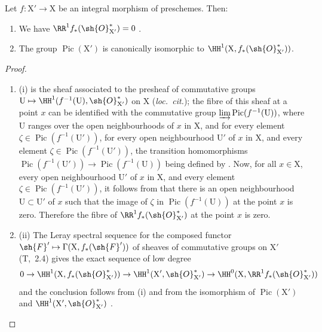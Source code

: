 \begin{corollary}[21.8.2]
\label{IV.21.8.2}
Let $f:\mathrm{X}'\to\mathrm{X}$ be an integral morphism of preschemes.
Then:
\begin{enumerate}[label=(\roman*)]
  \item We have $\RR^1 f_*(\sh{O}^*_{\mathrm{X}'})=0$ .
  \item The group $\operatorname{Pic}(\mathrm{X}')$ is canonically isomorphic to $\HH^1(\mathrm{X},f_*(\sh{O}^*_{\mathrm{X}'}))$.
\end{enumerate}
\end{corollary}

\begin{proof}
\begin{enumerate}[label=(\roman*)]
  \item (i) is the sheaf associated to the presheaf of commutative groups $\mathrm{U}\mapsto\HH^1(f^{-1}(\mathrm{U}),\sh{O}^*_{\mathrm{X}'})$ on $\mathrm{X}$ (\emph{loc.\ cit.});
the fibre of this sheaf at a point $x$ can be identified with the commutative group $\varinjlim\operatorname{Pic}(f^{-1}(\mathrm{U}))$, where $\mathrm{U}$ ranges over the open neighbourhoods of $x$ in $\mathrm{X}$, and for every element $\zeta\in\operatorname{Pic}(f^{-1}(\mathrm{U}'))$, for every open neighbourhood $\mathrm{U}'$ of $x$ in $\mathrm{X}$, and every element $\zeta\in\operatorname{Pic}(f^{-1}(\mathrm{U}'))$, the transition homomorphisms $\operatorname{Pic}(f^{-1}(\mathrm{U}'))\to\operatorname{Pic}(f^{-1}(\mathrm{U}))$ being defined by .
Now, for all $x\in\mathrm{X}$, every open neighbourhood $\mathrm{U}'$ of $x$ in $\mathrm{X}$, and every element $\zeta\in\operatorname{Pic}(f^{-1}(\mathrm{U}'))$, it follows from  that there is an open neighbourhood $\mathrm{U}\subset\mathrm{U}'$ of $x$ such that the image of $\zeta$ in $\operatorname{Pic}(f^{-1}(\mathrm{U}))$ at the point $x$ is zero.
Therefore the fibre of $\RR^1 f_*(\sh{O}^*_{\mathrm{X}'})$ at the point $x$ is zero.

  \item (ii) The Leray spectral sequence for the composed functor $\sh{F}'\mapsto\Gamma(\mathrm{X},f_*(\sh{F}'))$ of sheaves of commutative groups on $\mathrm{X}'$ (T,~2.4) gives the exact sequence of low degree
\[
  0\to\HH^1(\mathrm{X},f_*(\sh{O}^*_{\mathrm{X}'}))\to\HH^1(\mathrm{X}',\sh{O}^*_{\mathrm{X}'})\to\HH^0(\mathrm{X},\RR^1 f_*(\sh{O}^*_{\mathrm{X}'}))
\]
and the conclusion follows from (i) and from the isomorphism of $\operatorname{Pic}(\mathrm{X}')$ and $\HH^1(\mathrm{X}',\sh{O}^*_{\mathrm{X}'})$ .
\end{enumerate}
\end{proof}

